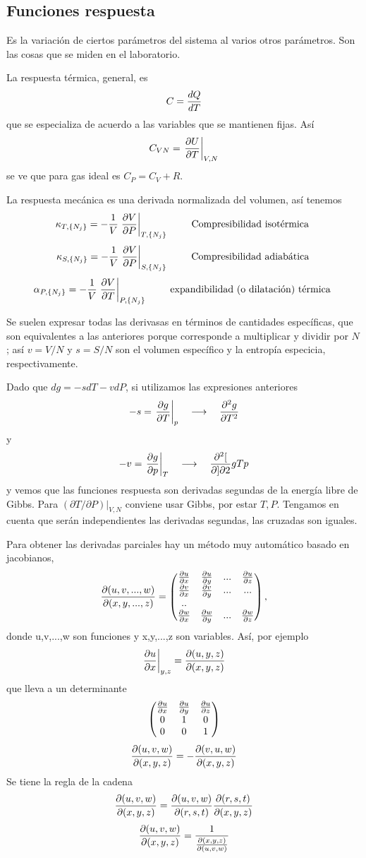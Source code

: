 \documentclass[10pt,oneside]{CBFT_book}
\begin{document}
\subsection{Funciones respuesta}

Es la variación de ciertos parámetros del sistema al varios otros parámetros.
Son las cosas que se miden en el laboratorio.

La respuesta térmica, general, es
\[
	C = \dtot{Q}{T} 
\]
que se especializa de acuerdo a las variables que se mantienen fijas. Así
\[
	C_{VN} = \dpare{U}{T}{V,N}
\]
se ve que para gas ideal es $C_P = C_V + R$.

La respuesta mecánica es una derivada normalizada del volumen, así tenemos
\[
	\kappa_{T,\{ N_j \}} = - \frac{1}{V} \dpare{V}{P}{T,\{ N_j \}} \qquad 
	\text{ Compresibilidad isotérmica }
\]
\[
	\kappa_{S,\{ N_j \}} = - \frac{1}{V} \dpare{V}{P}{S,\{ N_j \}} \qquad 
	\text{ Compresibilidad adiabática }
\]
\[
	\alpha_{P,\{ N_j \}} = - \frac{1}{V} \dpare{V}{T}{P,\{ N_j \}} \qquad 
	\text{ expandibilidad (o dilatación) térmica }
\]

Se suelen expresar todas las derivasas en términos de cantidades específicas, que 
son equivalentes a las anteriores porque corresponde a multiplicar y dividir por 
$N$; así $v = V/N$ y $s = S/N$ son el volumen específico y la entropía especicia,
respectivamente.

Dado que $dg = - s dT - v dP$, si utilizamos las expresiones anteriores 
\[
	-s = \dpare{g}{T}{p} \quad \longrightarrow \quad \dpar[2]{g}{T}
\]
y
\[
	-v = \dpare{g}{p}{T} \quad \longrightarrow \quad \dparcru[2]{g}{T}{p}
\]
y vemos que las funciones respuesta son derivadas segundas de la energía libre de
Gibbs.
Para $(\partial T / \partial P )|_{V,N}$ conviene usar Gibbs, por estar $T,P$.
Tengamos en cuenta que serán independientes las derivadas segundas, las cruzadas
son iguales.

Para obtener las derivadas parciales hay un método muy automático basado en 
jacobianos,
\[
	\dpar{(u,v,...,w)}{(x,y,...,z)} =
	\begin{pmatrix}
	 \dpar{u}{x} & \dpar{u}{y} & ... & \dpar{u}{z} \\
	 \dpar{v}{x} & \dpar{v}{y} & ... & ... \\
	 .. & & \\
	 \dpar{w}{x} & \dpar{w}{y} & ... & \dpar{w}{z} 
	\end{pmatrix},
\]
donde u,v,...,w son funciones y x,y,...,z son variables.
Así, por ejemplo
\[
	\dpare{u}{x}{y,z} = \dpar{(u,y,z)}{(x,y,z)}
\]
que lleva a un determinante
\[
	\begin{pmatrix}
	 \dpar{u}{x} & \dpar{u}{y} & \dpar{u}{z} \\
	 0 & 1 & 0 \\
	 0 & 0 & 1 
	\end{pmatrix}
\]
\[
	\dpar{(u,v,w)}{(x,y,z)} = -\dpar{(v,u,w)}{(x,y,z)}
\]
Se tiene la regla de la cadena
\[
	\dpar{(u,v,w)}{(x,y,z)} = 
	\dpar{(u,v,w)}{(r,s,t)} \dpar{(r,s,t)}{(x,y,z)}
\]
\[
	\dpar{(u,v,w)}{(x,y,z)} = \frac{1}{ \dpar{(x,y,z)}{(u,v,w)} }
\]
\end{document}
